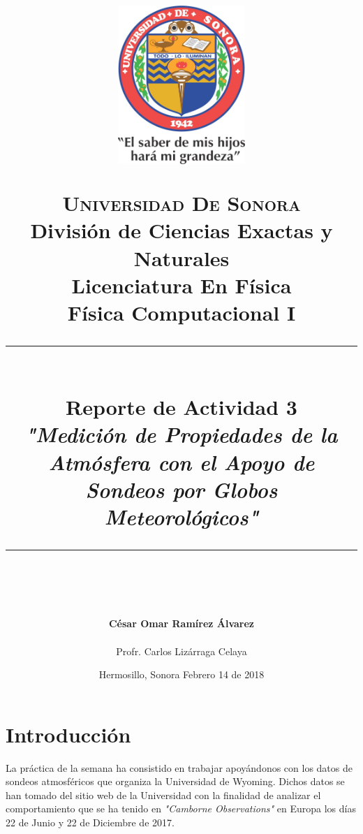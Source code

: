 \documentclass[12pt]{article}
\newcommand{\HRule}[1]{\rule{\linewidth}{#1}}
\begin{document}
\begin{titlepage}

\title{ \normalsize 
        \begin{center}
        \includegraphics[height=6cm]{Logo.jpg}
        \end{center}
        \LARGE \textsc{\textbf{Universidad De Sonora}} \\ \bigskip
		\Large División de Ciencias Exactas y Naturales \\
        Licenciatura En Física \\ \bigskip
        \bigskip
        Física Computacional I
		\\ [0.1cm]  
		\HRule{2pt} \\
		\Large \textbf{{Reporte de Actividad 3}} \\
        \textit{\textbf{"Medición de Propiedades de la Atmósfera con el Apoyo de Sondeos por Globos Meteorológicos"}}
		\HRule{2pt} \\
		\normalsize \vspace*{0.001\baselineskip}}
        
\date{\bigskip \Large Hermosillo, Sonora  \hspace*{\fill}  Febrero 14 de 2018}

        
\author{
		\Large\textbf{ César Omar Ramírez Álvarez} \\ \bigskip
        \\ \bigskip
       \Large Profr. Carlos Lizárraga Celaya}
       \end{titlepage}
       \maketitle
       

\newpage
\pagestyle{plain}

\section*{Introducción}
La práctica de la semana ha consistido en trabajar apoyándonos con los datos de sondeos atmosféricos que organiza la Universidad de Wyoming. Dichos datos se han tomado del sitio web de la Universidad con la finalidad de analizar el comportamiento que se ha tenido en \textit{"Camborne Observations"} en Europa los días 22 de Junio y 22 de Diciembre de 2017.\\
\end{document}
